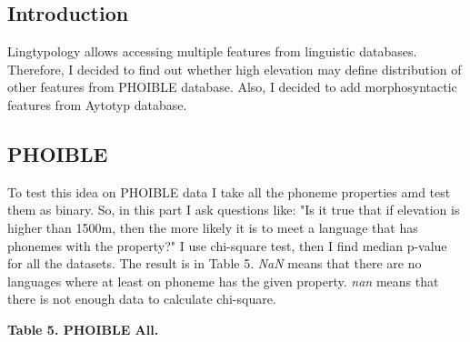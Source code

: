 \documentclass[a4paper,12pt]{article}
\begin{document}
\subsection{Introduction}
Lingtypology allows accessing multiple features from linguistic databases. Therefore, I decided to find out whether high elevation may define distribution of other features from PHOIBLE database. Also, I decided to add morphosyntactic features from Aytotyp database.

\subsection{PHOIBLE}

To test this idea on PHOIBLE data I take all the phoneme properties amd test them as binary. So, in this part I ask questions like: "Is it true that if elevation is higher than 1500m, then the more likely it is to meet a language that has phonemes with the property?" I use chi-square test, then I find median p-value for all the datasets.
The result is in Table 5. \textit{NaN} means that there are no languages where at least on phoneme has the given property. \textit{nan} means that there is not enough data to calculate chi-square.

\textbf{Table 5. PHOIBLE All.}
\end{document}
